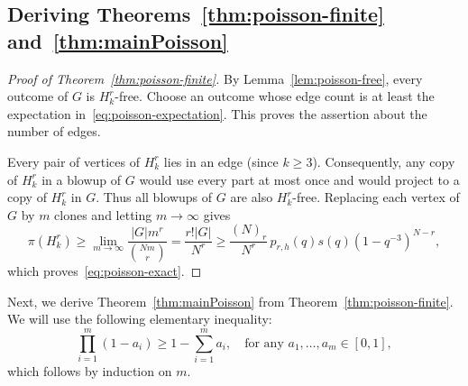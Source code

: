 \documentclass[12pt,a4paper]{article}
\numberwithin{equation}{section}
\theoremstyle{definition}
\theoremstyle{remark}
\begin{document}
\subsection{Deriving  Theorems~\ref{thm:poisson-finite} and~\ref{thm:mainPoisson}}


\begin{proof}[Proof of Theorem~\ref{thm:poisson-finite}]
	By Lemma~\ref{lem:poisson-free}, every outcome of $G$ is $H_k^r$-free. Choose an outcome whose edge count is at least the expectation in~\eqref{eq:poisson-expectation}. This proves the assertion about the number of edges.
	
	Every pair of vertices of $H_k^r$ lies in an edge (since $k\ge 3$). Consequently, any copy of $H_k^r$ in a blowup of $G$ would use every part at most once and would project to a copy of $H_k^r$ in $G$. Thus all blowups of $G$ are also $H_k^r$-free. Replacing each vertex of $G$ by $m$ clones and letting $m\to\infty$ gives
	\[
	\pi(H_k^r)\ge\lim_{m\to\infty}\frac{|G|m^r}{\binom{Nm}r}
	=\frac{r!|G|}{N^r}
	\ge\frac{(N)_r}{N^r}\,p_{r,h}(q)s(q)(1-q^{-3})^{N-r},
	\]
	which proves~\eqref{eq:poisson-exact}.
\end{proof}


Next, we derive Theorem~\ref{thm:mainPoisson} from Theorem~\ref{thm:poisson-finite}. 
We will use the following elementary inequality:
\begin{equation}\label{eq:product-bound}
	\prod_{i=1}^m(1-a_i)\ge1-\sum_{i=1}^m a_i,
	\quad\text{for any }a_1,\ldots,a_m\in[0,1],
\end{equation}
which follows by induction on $m$. 
\end{document}
